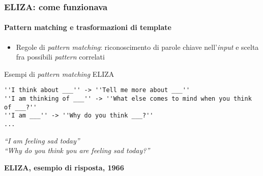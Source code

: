 %
\begin{frame}[t,fragile] \frametitle{ELIZA: come funzionava}
	{\small
		\onslide<1->
		\framesubtitle{Pattern matching e trasformazioni di template}
		\begin{itemize}[leftmargin=10pt,align=right]
			\item[\alert{\faArrowCircleRight}] \alert{Regole di \textit{pattern matching}:} riconoscimento di parole chiave nell'\textit{input} e scelta fra possibili \textit{pattern} correlati
		\end{itemize}
		\vspace*{.3cm}
		\begin{codeblock}{Esempi di \textit{pattern matching} ELIZA}
        	\begin{verbatim}
''I think about ___'' -> ''Tell me more about ___''
''I am thinking of ___'' -> ''What else comes to mind when you think of ___?''
''I am ___'' -> ''Why do you think ___?''
...
        	\end{verbatim}
    	\end{codeblock}
		\hspace*{4cm}
		\begin{minipage}[t]{.6\textwidth}
			\renewcommand{\epigraphsize}{\scriptsize}
			\setlength{\afterepigraphskip}{0pt}
			\setlength{\beforeepigraphskip}{5pt}
			\setlength{\epigraphwidth}{0.9\textwidth}
			\epigraph{\textit{\alert{\faUser} ``\alert{I am} feeling sad today''\\
			\alert{\faTerminal} ``Why do you think you are feeling sad today?''}}{\textbf{ELIZA, esempio di risposta, 1966}}
		\end{minipage}
	}
\end{frame}
%
